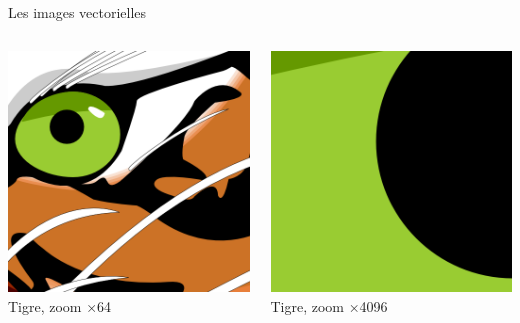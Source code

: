 \begin{frame}[fragile]{Les images vectorielles}
\begin{columns}
\begin{column}{.33\linewidth}
      \includegraphics[width=\linewidth]{img/06/tiger4096}\\Tigre, zoom ×64
    \end{column}%
    \begin{column}{.33\linewidth}\centering
      \includegraphics[width=\linewidth]{img/06/tiger32768}\\Tigre, zoom ×4096
    \end{column}%
  \end{columns}
\end{frame}

